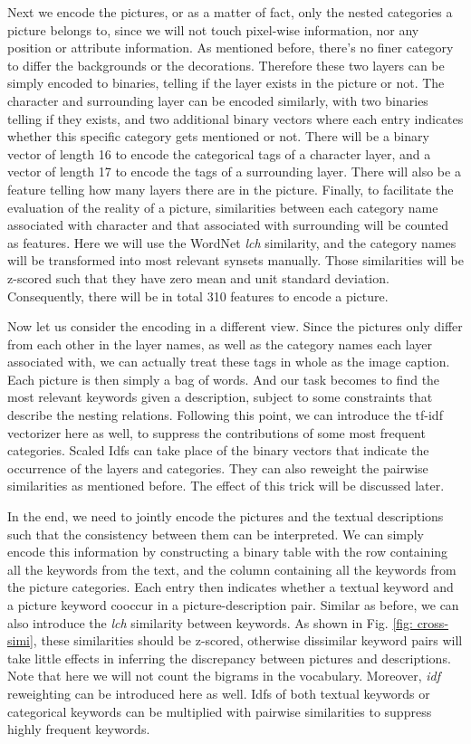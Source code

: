\documentclass{article} %
\begin{document}
Next we encode the pictures, or as a matter of fact, only the nested categories a picture belongs to, since we will not touch pixel-wise information, nor any position or attribute information. As mentioned before, there's no finer category to differ the backgrounds or the decorations. Therefore these two layers can be simply encoded to binaries, telling if the layer exists in the picture or not. The character and surrounding layer can be encoded similarly, with two binaries telling if they exists, and two additional binary vectors where each entry indicates whether this specific category gets mentioned or not. There will be a binary vector of length 16 to encode the categorical tags of a character layer, and a vector of length 17 to encode the tags of a surrounding layer. There will also be a feature telling how many layers there are in the picture. Finally, to facilitate the evaluation of the reality of a picture, similarities between each category name associated with character and that associated with surrounding will be counted as features. Here we will use the WordNet \emph{lch} similarity, and the category names will be transformed into most relevant synsets manually. Those similarities will be z-scored such that they have zero mean and unit standard deviation. Consequently, there will be in total 310 features to encode a picture.

Now let us consider the encoding in a different view. Since the pictures only differ from each other in the layer names, as well as the category names each layer associated with, we can actually treat these tags in whole as the image caption. Each picture is then simply a bag of words. And our task becomes to find the most relevant keywords given a description, subject to some constraints that describe the nesting relations. Following this point, we can introduce the tf-idf vectorizer here as well, to suppress the contributions of some most frequent categories. Scaled Idfs can take place of the binary vectors that indicate the occurrence of the layers and categories. They can also reweight the pairwise similarities as mentioned before. The effect of this trick will be discussed later.

In the end, we need to jointly encode the pictures and the textual descriptions such that the consistency between them can be interpreted. We can simply encode this information by constructing a binary table with the row containing all the keywords from the text, and the column containing all the keywords from the picture categories. Each entry then indicates whether a textual keyword and a picture keyword cooccur in a picture-description pair. Similar as before, we can also introduce the \emph{lch} similarity between keywords. As shown in Fig. \ref{fig: cross-simi}, these similarities should be z-scored, otherwise dissimilar keyword pairs will take little effects in inferring the discrepancy between pictures and descriptions. Note that here we will not count the bigrams in the vocabulary. Moreover, \emph{idf} reweighting can be introduced here as well. Idfs of both textual keywords or categorical keywords can be multiplied with pairwise similarities to suppress highly frequent keywords.
\end{document}
